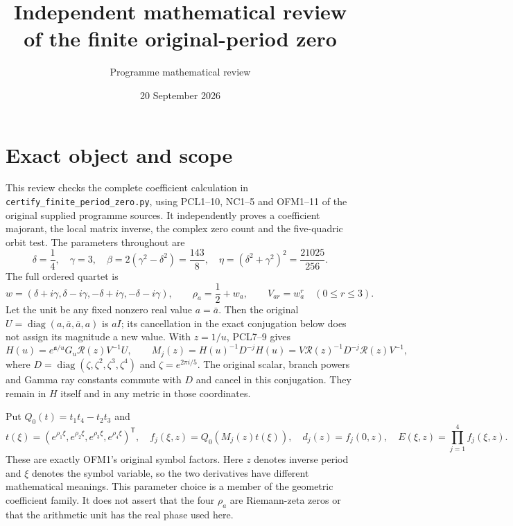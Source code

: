 \documentclass[11pt]{article}
\title{Independent mathematical review of the finite original-period zero}
\author{Programme mathematical review}
\date{20 September 2026}
\newcommand{\diag}{\operatorname{diag}}
\begin{document}
\maketitle

\section{Exact object and scope}
This review checks the complete coefficient calculation in
\texttt{certify\_finite\_period\_zero.py}, using PCL1--10,
NC1--5 and OFM1--11 of the original supplied programme sources.
It independently proves a coefficient majorant, the local matrix
inverse, the complex zero count and the five-quadric orbit test.
The parameters throughout are
\[
 \delta=\frac14,\quad\gamma=3,\quad
 \beta=2(\gamma^2-\delta^2)=\frac{143}{8},\quad
 \eta=(\delta^2+\gamma^2)^2=\frac{21025}{256}.
 \tag{FPR1}
\]
The full ordered quartet is
\[
 w=(\delta+i\gamma,\delta-i\gamma,-\delta+i\gamma,-\delta-i\gamma),
 \qquad \rho_a=\frac12+w_a,
 \qquad V_{ar}=w_a^r\quad(0\le r\le3).
 \tag{FPR2}
\]
Let the unit be any fixed nonzero real value $a=\bar a$.
Then the original $U=\diag(a,\bar a,\bar a,a)$ is $aI$;
its cancellation in the exact conjugation below does not assign
its magnitude a new value. With $z=1/u$, PCL7--9 gives
\[
 H(u)=e^{\mathfrak a/u}G_u\mathcal R(z)V^{-1}U,
 \qquad
 M_j(z)=H(u)^{-1}D^{-j}H(u)
       =V\mathcal R(z)^{-1}D^{-j}\mathcal R(z)V^{-1},
 \tag{FPR3}
\]
where $D=\diag(\zeta,\zeta^2,\zeta^3,\zeta^4)$ and
$\zeta=e^{2\pi i/5}$. The original scalar, branch powers and
Gamma ray constants commute with $D$ and cancel in this conjugation.
They remain in $H$ itself and in any metric in those coordinates.

Put $Q_0(t)=t_1t_4-t_2t_3$ and
\[
 t(\xi)=(e^{\rho_1\xi},e^{\rho_2\xi},
                 e^{\rho_3\xi},e^{\rho_4\xi})^{\mathsf T},\quad
 f_j(\xi,z)=Q_0(M_j(z)t(\xi)),\quad
 d_j(z)=f_j(0,z),\quad E(\xi,z)=\prod_{j=1}^4 f_j(\xi,z).
 \tag{FPR4}
\]
These are exactly OFM1's original symbol factors. Here $z$ denotes
inverse period and $\xi$ denotes the symbol variable, so the two
derivatives have different mathematical meanings.
This parameter choice is a member of the geometric coefficient
family. It does not assert that the four $\rho_a$ are Riemann-zeta
zeros or that the arithmetic unit has the real phase used here.
\end{document}

